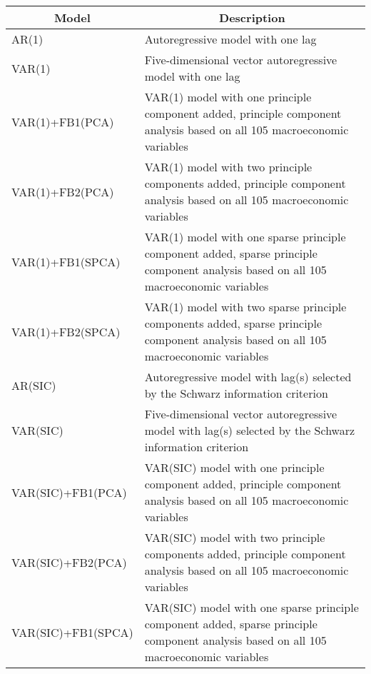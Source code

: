 \label{tab:model-description}
\begin{footnotesize}
\begin{tabularx}{\linewidth}{lX}
\caption{Models used in forecasting} \\
\toprule
\multicolumn{1}{c}{Model} & \multicolumn{1}{c}{Description} \\ \midrule 
\endhead
\bottomrule
\endfoot
AR(1)                     & Autoregressive model with one lag                                                                                                            \\
VAR(1)                    & Five-dimensional vector autoregressive model with one lag                                                                                    \\
VAR(1)+FB1(PCA)           & VAR(1) model with one principle component added, principle component analysis based on all 105 macroeconomic variables                       \\
VAR(1)+FB2(PCA)           & VAR(1) model with two principle components added, principle component analysis based on all 105 macroeconomic variables                      \\
VAR(1)+FB1(SPCA)          & VAR(1) model with one sparse principle component added, sparse principle component analysis based on all 105 macroeconomic variables         \\
VAR(1)+FB2(SPCA)          & VAR(1) model with two sparse principle components added, sparse principle component analysis based on all 105 macroeconomic variables        \\
AR(SIC)                   & Autoregressive model with lag(s) selected by the Schwarz information criterion                                                               \\
VAR(SIC)                  & Five-dimensional vector autoregressive model with lag(s) selected by the Schwarz information criterion                                       \\
VAR(SIC)+FB1(PCA)         & VAR(SIC) model with one principle component added, principle component analysis based on all 105 macroeconomic variables                     \\
VAR(SIC)+FB2(PCA)         & VAR(SIC) model with two principle components added, principle component analysis based on all 105 macroeconomic variables                    \\
VAR(SIC)+FB1(SPCA)        & VAR(SIC) model with one sparse principle component added, sparse principle component analysis based on all 105 macroeconomic variables \\

\end{tabularx}
\end{footnotesize}
